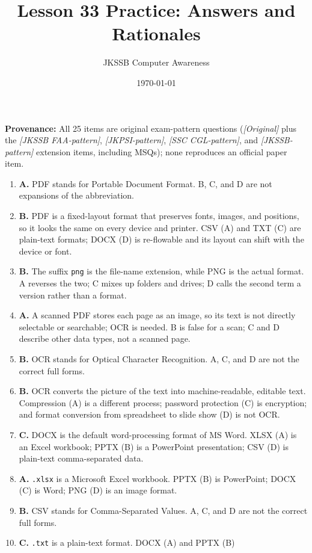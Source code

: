 \documentclass[11pt]{article}
\title{Lesson 33 Practice: Answers and Rationales}
\author{JKSSB Computer Awareness}
\date{\today}
\begin{document}
\maketitle
\noindent\textbf{Provenance:} All 25 items are original exam-pattern questions (\textit{[Original]} plus the \textit{[JKSSB FAA-pattern]}, \textit{[JKPSI-pattern]}, \textit{[SSC CGL-pattern]}, and \textit{[JKSSB-pattern]} extension items, including MSQs); none reproduces an official paper item.
\begin{enumerate}[label=\textbf{Q\arabic*.}, leftmargin=*]
\item \textbf{A.} PDF stands for Portable Document Format. B, C, and D are
  not expansions of the abbreviation.
\item \textbf{B.} PDF is a fixed-layout format that preserves fonts, images,
  and positions, so it looks the same on every device and printer. CSV (A)
  and TXT (C) are plain-text formats; DOCX (D) is re-flowable and its layout
  can shift with the device or font.
\item \textbf{B.} The suffix \texttt{png} is the file-name extension, while
  PNG is the actual format. A reverses the two; C mixes up folders and
  drives; D calls the second term a version rather than a format.
\item \textbf{A.} A scanned PDF stores each page as an image, so its text is
  not directly selectable or searchable; OCR is needed. B is false for a
  scan; C and D describe other data types, not a scanned page.
\item \textbf{B.} OCR stands for Optical Character Recognition. A, C, and D
  are not the correct full forms.
\item \textbf{B.} OCR converts the picture of the text into machine-readable,
  editable text. Compression (A) is a different process; password protection
  (C) is encryption; and format conversion from spreadsheet to slide show (D)
  is not OCR.
\item \textbf{C.} DOCX is the default word-processing format of MS Word.
  XLSX (A) is an Excel workbook; PPTX (B) is a PowerPoint presentation; CSV
  (D) is plain-text comma-separated data.
\item \textbf{A.} \texttt{.xlsx} is a Microsoft Excel workbook. PPTX (B) is
  PowerPoint; DOCX (C) is Word; PNG (D) is an image format.
\item \textbf{B.} CSV stands for Comma-Separated Values. A, C, and D are not
  the correct full forms.
\item \textbf{C.} \texttt{.txt} is a plain-text format. DOCX (A) and PPTX (B)

\end{enumerate}
\end{document}

